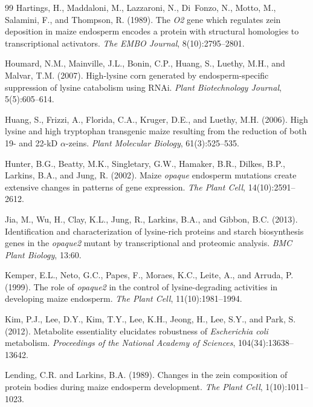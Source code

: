 \documentclass[12pt,a4paper]{article}
\begin{document}
\begin{thebibliography}{99}
Hartings, H., Maddaloni, M., Lazzaroni, N., Di~Fonzo, N., Motto, M., Salamini, F., and Thompson, R. (1989).
\newblock The \textit{O2} gene which regulates zein deposition in maize endosperm encodes a protein with structural homologies to transcriptional activators.
\newblock \textit{The EMBO Journal}, 8(10):2795--2801.

Houmard, N.M., Mainville, J.L., Bonin, C.P., Huang, S., Luethy, M.H., and Malvar, T.M. (2007).
\newblock High-lysine corn generated by endosperm-specific suppression of lysine catabolism using RNAi.
\newblock \textit{Plant Biotechnology Journal}, 5(5):605--614.

Huang, S., Frizzi, A., Florida, C.A., Kruger, D.E., and Luethy, M.H. (2006).
\newblock High lysine and high tryptophan transgenic maize resulting from the reduction of both 19- and 22-kD $\alpha$-zeins.
\newblock \textit{Plant Molecular Biology}, 61(3):525--535.

Hunter, B.G., Beatty, M.K., Singletary, G.W., Hamaker, B.R., Dilkes, B.P., Larkins, B.A., and Jung, R. (2002).
\newblock Maize \textit{opaque} endosperm mutations create extensive changes in patterns of gene expression.
\newblock \textit{The Plant Cell}, 14(10):2591--2612.

Jia, M., Wu, H., Clay, K.L., Jung, R., Larkins, B.A., and Gibbon, B.C. (2013).
\newblock Identification and characterization of lysine-rich proteins and starch biosynthesis genes in the \textit{opaque2} mutant by transcriptional and proteomic analysis.
\newblock \textit{BMC Plant Biology}, 13:60.

Kemper, E.L., Neto, G.C., Papes, F., Moraes, K.C., Leite, A., and Arruda, P. (1999).
\newblock The role of \textit{opaque2} in the control of lysine-degrading activities in developing maize endosperm.
\newblock \textit{The Plant Cell}, 11(10):1981--1994.

Kim, P.J., Lee, D.Y., Kim, T.Y., Lee, K.H., Jeong, H., Lee, S.Y., and Park, S. (2012).
\newblock Metabolite essentiality elucidates robustness of \textit{Escherichia coli} metabolism.
\newblock \textit{Proceedings of the National Academy of Sciences}, 104(34):13638--13642.

Lending, C.R. and Larkins, B.A. (1989).
\newblock Changes in the zein composition of protein bodies during maize endosperm development.
\newblock \textit{The Plant Cell}, 1(10):1011--1023.


\end{thebibliography}
\end{document}
